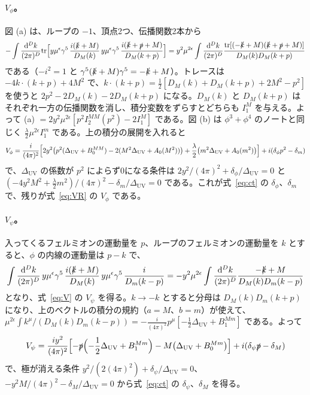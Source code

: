 \documentclass[a4paper,10pt]{ltjsarticle}
\newcommand{\dd}{\mathrm{d}}
\begin{document}
\paragraph{$V_\phi$。}図 (a) は、ループの $-1$、頂点2つ、伝播関数2本から
\begin{equation*}
-\int\frac{\dd^Dk}{(2\pi)^D}\mathrm{tr}\Bigl[y\mu^\epsilon\gamma^5\,\frac{i(\slashed k+M)}{D_M(k)}\,y\mu^\epsilon\gamma^5\,\frac{i(\slashed k+\slashed p+M)}{D_M(k+p)}\Bigr]
=y^2\mu^{2\epsilon}\int\frac{\dd^Dk}{(2\pi)^D}\frac{\mathrm{tr}[(-\slashed k+M)(\slashed k+\slashed p+M)]}{D_M(k)D_M(k+p)}
\end{equation*}
である（$-i^2=1$ と $\gamma^5(\slashed k+M)\gamma^5=-\slashed k+M$）。トレースは $-4k\cdot(k+p)+4M^2$ で、$k\cdot(k+p)=\frac12[D_M(k)+D_M(k+p)+2M^2-p^2]$ を使うと $2p^2-2D_M(k)-2D_M(k+p)$ になる。$D_M(k)$ と $D_M(k+p)$ はそれぞれ一方の伝播関数を消し、積分変数をずらすとどちらも $I_1^M$ を与える。よって (a) $=2y^2\mu^{2\epsilon}[p^2I_2^{MM}(p^2)-2I_1^M]$ である。図 (b) は $\phi^3+\phi^4$ のノートと同じく $\frac\lambda2\mu^{2\epsilon}I_1^m$ である。上の積分の展開を入れると
\begin{equation*}
V_\phi=\frac{i}{(4\pi)^2}\Bigl[2y^2\bigl(p^2(\Delta_{\mathrm{UV}}+B_0^{MM})-2(M^2\Delta_{\mathrm{UV}}+A_0(M^2))\bigr)+\frac\lambda2\bigl(m^2\Delta_{\mathrm{UV}}+A_0(m^2)\bigr)\Bigr]+i(\delta_\phi p^2-\delta_m)
\end{equation*}
で、$\Delta_{\mathrm{UV}}$ の係数が $p^2$ によらず0になる条件は $2y^2/(4\pi)^2+\delta_\phi/\Delta_{\mathrm{UV}}=0$ と $(-4y^2M^2+\frac\lambda2m^2)/(4\pi)^2-\delta_m/\Delta_{\mathrm{UV}}=0$ である。これが式~\eqref{eq:ct} の $\delta_\phi$、$\delta_m$ で、残りが式~\eqref{eq:VR} の $V_\phi$ である。

\paragraph{$V_\psi$。}入ってくるフェルミオンの運動量を $p$、ループのフェルミオンの運動量を $k$ とすると、$\phi$ の内線の運動量は $p-k$ で、
\begin{equation*}
\int\frac{\dd^Dk}{(2\pi)^D}\,y\mu^\epsilon\gamma^5\,\frac{i(\slashed k+M)}{D_M(k)}\,y\mu^\epsilon\gamma^5\,\frac{i}{D_m(k-p)}
=-y^2\mu^{2\epsilon}\int\frac{\dd^Dk}{(2\pi)^D}\frac{-\slashed k+M}{D_M(k)D_m(k-p)}
\end{equation*}
となり、式~\eqref{eq:V} の $V_\psi$ を得る。$k\to-k$ とすると分母は $D_M(k)D_m(k+p)$ になり、上のベクトルの積分の規約（$a=M$、$b=m$）が使えて、$\mu^{2\epsilon}\int k^\mu/(D_M(k)D_m(k-p))=-\frac{i}{(4\pi)^2}p^\mu[-\frac12\Delta_{\mathrm{UV}}+B_1^{Mm}]$ である。よって
\begin{equation*}
V_\psi=\frac{iy^2}{(4\pi)^2}\Bigl[-\slashed p\Bigl(-\frac12\Delta_{\mathrm{UV}}+B_1^{Mm}\Bigr)-M\bigl(\Delta_{\mathrm{UV}}+B_0^{Mm}\bigr)\Bigr]+i(\delta_\psi\slashed p-\delta_M)
\end{equation*}
で、極が消える条件 $y^2/(2(4\pi)^2)+\delta_\psi/\Delta_{\mathrm{UV}}=0$、$-y^2M/(4\pi)^2-\delta_M/\Delta_{\mathrm{UV}}=0$ から式~\eqref{eq:ct} の $\delta_\psi$、$\delta_M$ を得る。
\end{document}
